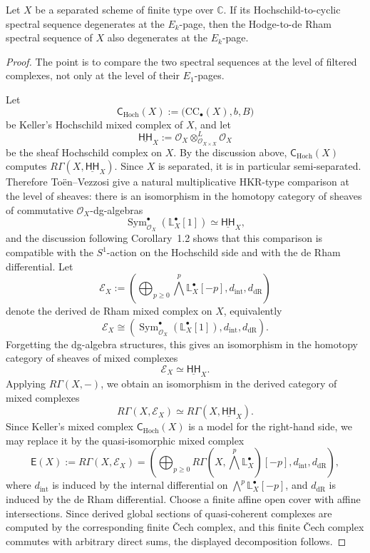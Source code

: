 \documentclass[12pt,reqno]{amsart}
\begin{document}
\begin{proposition}\label{prop:HC-to-HdR}
Let \(X\) be a separated scheme of finite type over \(\mathbb C\). If its Hochschild-to-cyclic spectral sequence
degenerates at the
\(E_k\)-page, then the Hodge-to-de Rham spectral sequence of \(X\) also degenerates
at the \(E_k\)-page.
\end{proposition}

\begin{proof}
The point is to compare the two spectral sequences at the level of filtered complexes, not only at
the level of their \(E_1\)-pages.

Let
\[
\mathsf{C}_{\mathrm{Hoch}}(X):=\bigl(\mathrm{CC}_{\bullet}(X),b,B\bigr)
\]
be Keller's Hochschild mixed complex of \(X\), and let
\[
\underline{\mathsf{HH}}_X:=\mathcal{O}_X\otimes^L_{\mathcal{O}_{X\times X}}\mathcal{O}_X
\]
be the sheaf Hochschild complex on \(X\). By the discussion above,
\(\mathsf{C}_{\mathrm{Hoch}}(X)\) computes \(R\Gamma(X,\underline{\mathsf{HH}}_X)\).
Since \(X\) is separated, it is in particular semi-separated. Therefore
To\"en--Vezzosi \cite[Corollary~1.2 and the discussion following it]{Toen-Vezzosi_11}
give a natural multiplicative HKR-type comparison at the level of sheaves:
there is an isomorphism in the homotopy category of sheaves of commutative
\(\mathcal{O}_X\)-dg-algebras
\[
\operatorname{Sym}^{\bullet}_{\mathcal{O}_X}\!\left(\mathbb{L}^{\bullet}_X[1]\right)
\simeq
\underline{\mathsf{HH}}_X,
\]
and the discussion following Corollary~1.2 shows that this comparison is compatible with the
\(S^1\)-action on the Hochschild side and with the de Rham differential. Let
\[
\mathcal{E}_X:=
\left(
\bigoplus_{p\ge 0}\bigwedge^p\mathbb{L}^{\bullet}_X[-p],
d_{\mathrm{int}},
d_{\mathrm{dR}}
\right)
\]
denote the derived de Rham mixed complex on \(X\), equivalently
\[
\mathcal{E}_X\cong \left(\operatorname{Sym}^{\bullet}_{\mathcal{O}_X}\!\left(\mathbb{L}^{\bullet}_X[1]\right),d_{\mathrm{int}},d_{\mathrm{dR}}\right).
\]
Forgetting the dg-algebra structures, this gives an isomorphism in the homotopy category of sheaves of mixed complexes
\[
\mathcal{E}_X\simeq \underline{\mathsf{HH}}_X.
\]
Applying \(R\Gamma(X,-)\), we obtain an isomorphism in the derived category of mixed complexes
\[
R\Gamma(X,\mathcal{E}_X)\simeq R\Gamma(X,\underline{\mathsf{HH}}_X).
\]
Since Keller's mixed complex \(\mathsf{C}_{\mathrm{Hoch}}(X)\) is a model for the right-hand side,
we may replace it by the quasi-isomorphic mixed complex
\[
\mathsf{E}(X):=R\Gamma(X,\mathcal{E}_X)=
\left(
\bigoplus_{p\ge 0}R\Gamma\!\left(X,\bigwedge^p\mathbb{L}^{\bullet}_X\right)[-p],
d_{\mathrm{int}},
d_{\mathrm{dR}}
\right),
\]
where \(d_{\mathrm{int}}\) is induced by the internal differential on
\(\bigwedge^p\mathbb{L}^{\bullet}_X[-p]\), and \(d_{\mathrm{dR}}\) is induced by the de Rham differential.
Choose a finite affine open cover with affine intersections. Since derived global sections of quasi-coherent complexes are computed by the corresponding finite \v{C}ech complex, and this finite \v{C}ech complex commutes with arbitrary direct sums, the displayed decomposition follows.


\end{proof}
\end{document}
